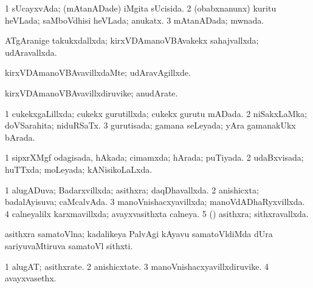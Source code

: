 {{\bentry
{} 
\gl{\gu}
\expl{}
\bmng
{} 
\emng
\eentry

\bentry
{} 
\gl{\gu}
\expl{}
\bmng
\bnum
\num{1} sUcayxvAda; (mAtanADade) iMgita sUcisida. 
\num{2} (obabxnanunx) kuritu heVLada; saMboVdhisi heVLada; anukatx. 
\num{3} mAtanADada; mwnada. 
\enum
\emng
\eentry

\bentry
{} 
\gl{\gu}
\expl{}
\bmng
ATgAranige takukxdallxda; kirxVDAmanoVBAvakekx sahajvallxda; udAravallxda. 
\emng
\eentry

\bentry
{} 
\gl{\kirxvi}
\expl{}
\bmng
kirxVDAmanoVBAvavillxdaMte; udAravAgillxde. 
\emng
\eentry

\bentry
{} 
\gl{\nA}
\expl{}
\bmng
kirxVDAmanoVBAvavillxdiruvike; anudArate. 
\emng
\eentry

\bentry
{} 
\gl{\gu}
\expl{}
\bmng
{} 
\emng
\eentry

\bentry
{} 
\gl{\gu}
\expl{}
\bmng
\bnum
\num{1} cukekxgaLillxda; cukekx gurutillxda; cukekx gurutu mADada. 
\num{2} niSakxLaMka; doVSarahita; niduRSaTx. 
\num{3} gurutisada; gamana seLeyada; yAra gamanakUkx bArada. 
\enum
\emng
\eentry

\bentry
{} 
\gl{\gu}
\expl{}
\bmng
\bnum
\num{1} sipxrXMgf odagisada, hAkada; cimamxda; hArada; puTiyada. 
\num{2} udaBxvisada; huTTxda; moLeyada; kANisikoLaLxda. 
\enum
\emng
\eentry

\bentry
{} 
\gl{\gu}
\bmng
\bnum
\num{1} alugADuva; Badarxvillxda; asithxra; daqDhavallxda. 
\num{2} anishicxta; badalAyisuva; caMcalvAda. 
\num{3} manoVnishacxyavillxda; manoVdADhaRyxvillxda. 
\num{4} calneyalilx karxmavillxda; avayxvasithxta calneya. 
\num{5} (\ravi) asithxra; sithxravallxda. 
\enum
\emng
\eentry

\bentry
{} 
\gl{\nA}
\expl{}
\bmng
asithxra samatoVlna; kadalikeya PalvAgi kAyavu samatoVldiMda dUra sariyuvaMtiruva samatoVl sithxti. 
\emng
\eentry

\bentry
{} 
\gl{\nA}
\expl{}
\bmng
\bnum
\num{1} alugAT; asithxrate. 
\num{2} anishicxtate. 
\num{3} manoVnishacxyavillxdiruvike. 
\num{4} avayxvasethx. 
\enum
\emng
\eentry

}}
